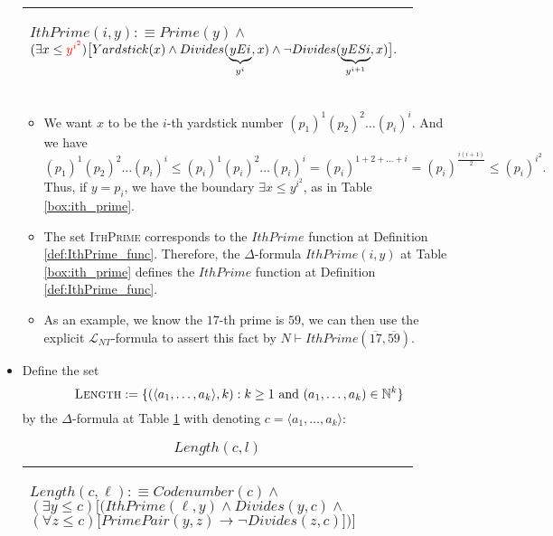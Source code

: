 \documentclass[11pt,letterpaper]{book}
\theoremstyle{definition}
\begin{document}
\begin{itemize}
{\begin{table}[h]
\begin{tabular}{|p{0.9\linewidth}|}
\begin{center}
$IthPrime(i, y) : \equiv Prime(y) \land$ $  (\exists x \leq {\color{red} y^{i^2} } ) \big[ Yardstick(x) \land
Divides(\underbrace{y E i}_{y^i}, x) \land \lnot Divides(\underbrace{y E S i}_{y^{i+1}}, x) \big]. $
\end{center} \\
\hline
\end{tabular}

\end{table}

\begin{itemize}
\item{We want $x $ to be the $i$-th yardstick number $(p_1)^1 (p_2)^2 \ldots (p_i) ^i$. And we have
$$ (p_1)^1 (p_2)^2 \ldots (p_i) ^i \leq (p_i)^1 (p_i)^2 \ldots (p_i) ^i    = (p_i) ^{1 + 2 + \ldots + i} = (p_i)^{ \frac{i (i+1) }{2} } \leq (p_i)^{i^2} .$$
Thus, if $y = p_i$, we have the boundary $ \exists x \leq y^{i^2}$, as in Table \ref{box:ith_prime}.}
\item{The set \textsc{IthPrime} corresponds to the $IthPrime$ function at Definition \ref{def:IthPrime_func}. Therefore, the $\Delta$-formula $IthPrime(i, y)$ at Table \ref{box:ith_prime} defines the $IthPrime$ function at Definition \ref{def:IthPrime_func}.}
\item{As an example, we know the $17$-th prime is $59$, we can then use the
explicit $\mathcal{L}_{NT}$-formula to assert this fact by $N \vdash
IthPrime(\overline{17}, \overline{59} )$.}
\end{itemize}
}
\item{Define the set
$$ \text{\textsc{Length}} : = \{ ( \langle a_1, \ldots, a_k \rangle, k )  : k \geq 1 \text{ and } (a_1, \ldots, a_k) \in \mathbb{N}^k \}  $$
by the $\Delta$-formula at Table \ref{box:length} with denoting $c = \langle a_1, \ldots, a_k  \rangle $:

\begin{table}[h]
\label{box:length}
\caption{$Length(c, l)$}
\begin{tabular}{|p{0.9\linewidth}|}
\hline
\rule{0pt}{3ex}
\begin{center}
$Length(c, \ell ) : \equiv Codenumber(c) \land $
$(\exists y \leq c) \Bigg[ \Big( IthPrime(\ell, y) \land
Divides(y, c) \land $
$ (\forall z \leq c) \big[ PrimePair(y, z) \rightarrow \lnot Divides(z,c)
\big]  \Big) \Bigg]$
\end{center} \\
\hline
\end{tabular}


\end{table}}
\end{itemize}
\end{document}
